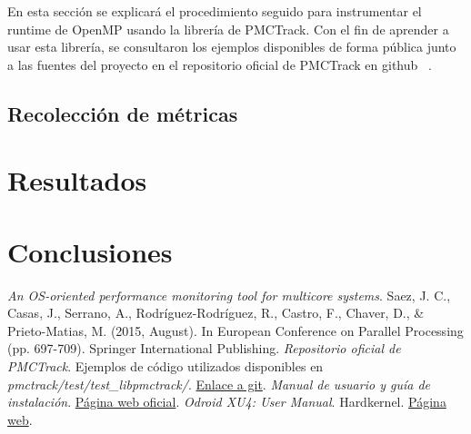 En esta sección se explicará el procedimiento seguido para instrumentar el runtime de OpenMP usando la librería de PMCTrack. Con el fin de aprender a usar esta librería, se consultaron los ejemplos disponibles de forma pública junto a las fuentes del proyecto en el repositorio oficial de PMCTrack en github ~\cite{pmc-git}.

\subsection{Recolección de métricas}\label{sec:recolecc}

\section{Resultados}\label{sec:results}

\section{Conclusiones}\label{sec:conclu}


\begin{thebibliography}{1}
\textit{An OS-oriented performance monitoring tool for multicore systems}. Saez, J. C., Casas, J., Serrano, A., Rodríguez-Rodríguez, R., Castro, F., Chaver, D., \& Prieto-Matias, M. (2015, August). In European Conference on Parallel Processing (pp. 697-709). Springer International Publishing.
 \textit{Repositorio oficial de PMCTrack}. Ejemplos de código utilizados disponibles en \textit{pmctrack/test/test\_libpmctrack/}. \href{https://github.com/jcsaezal/pmctrack}{Enlace a git}.
 \textit{Manual de usuario y guía de instalación}. \href{https://pmctrack.dacya.ucm.es/getting-started/}{Página web oficial}.
 \textit{Odroid XU4: User Manual}. Hardkernel. \href{http://magazine.odroid.com/odroid-xu4/}{Página web}.

\end{thebibliography}

